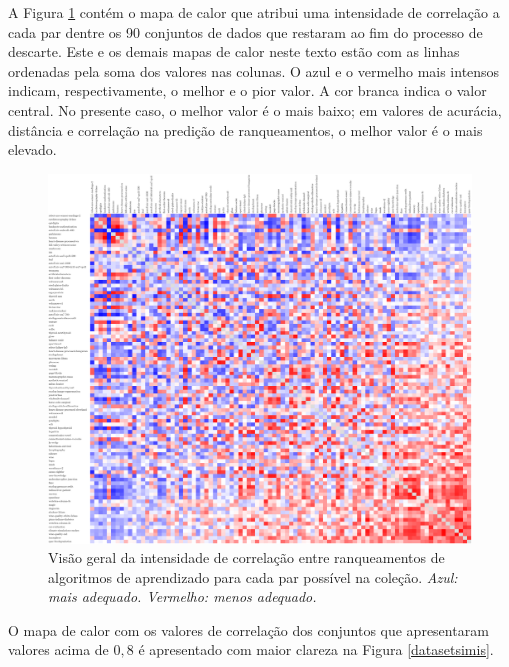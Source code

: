 A Figura \ref{datasetsimistodos} contém o mapa de calor \cite{wilkinson2009history} que atribui uma intensidade de correlação a cada par dentre os 90 conjuntos de dados que restaram ao fim do processo de descarte.
Este e os demais mapas de calor neste texto estão com as linhas ordenadas pela soma dos valores nas colunas.
O azul e o vermelho mais intensos indicam, respectivamente, o melhor e o pior valor.
A cor branca indica o valor central.
No presente caso, o melhor valor é o mais baixo; em valores de acurácia, distância e correlação na predição de ranqueamentos, o melhor valor é o mais elevado. 
\begin{figure}
  \setlength{\unitlength}{1.0cm}
  \centering
    \includegraphics[scale=0.136]{images/heatbitmap.pdf}
  \caption[Correlação entre ranqueamentos de algoritmos de aprendizado.]{Visão geral da intensidade de correlação entre ranqueamentos de algoritmos de aprendizado para cada par possível na coleção. \textit{Azul: mais adequado. Vermelho: menos adequado.}}
  \label{datasetsimistodos}
\end{figure}
O mapa de calor com os valores de correlação dos conjuntos que apresentaram valores acima de $0,8$ é apresentado com maior clareza na Figura \ref{datasetsimis}.
